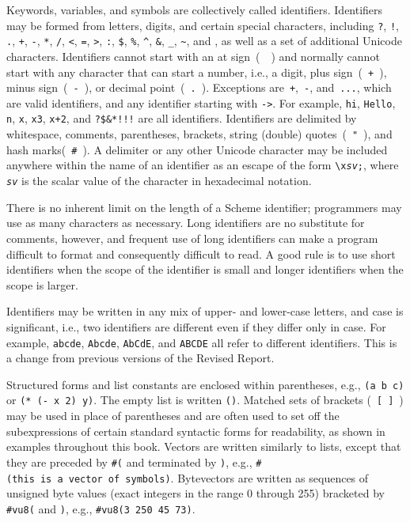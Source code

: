 Keywords, variables, and symbols are collectively called
\label{intro_s30}identifiers.
Identifiers may be formed from letters, digits, and certain special
characters, including \texttt{?}, \texttt{!}, \texttt{.}, \texttt{+},
\texttt{-}, \texttt{*}, \texttt{/}, \texttt{\textless{}}, \texttt{=}, \texttt{\textgreater{}},
\texttt{:}, \texttt{\${}}, \texttt{\%{}}, \texttt{\^{}}, \texttt{\&{}}, \texttt{\_{}},
\texttt{\~{}}, and \texttt{\@{}}, as well as a set of additional Unicode
characters.
Identifiers cannot start with an at sign ( \texttt{\@{}} ) and
normally cannot start with any character that can start
a number, i.e., a digit, plus sign ( \texttt{+} ), minus sign ( \texttt{-} ), or
decimal point ( \texttt{.} ).
Exceptions are \texttt{+}, \texttt{-}, and \texttt{...}, which are valid identifiers,
and any identifier starting with \texttt{-\textgreater{}}.
For example, \texttt{hi}, \texttt{Hello}, \texttt{n}, \texttt{x}, \texttt{x3}, \texttt{x+2}, and \texttt{?\${}\&{}*!!!} are all
identifiers.
Identifiers are delimited by whitespace, comments, parentheses, brackets, string
(double) quotes ( \texttt{"} ), and hash marks( \texttt{\#{}} ).
A delimiter or any other Unicode character may be included anywhere within the
name of an identifier as an escape of the form \texttt{\textbackslash{}x\textit{sv};},
where \texttt{\textit{sv}} is the scalar value of the character in hexadecimal
notation.


There is no inherent limit on the length of a Scheme identifier;
programmers may use as many characters as necessary.
Long identifiers are no substitute for comments, however, and
frequent use of long identifiers can make a program difficult to
format and consequently difficult to read.  
A good rule is to use short identifiers when the scope of the identifier
is small and longer identifiers when the scope is larger.


Identifiers may be written in any mix of upper- and lower-case letters,
and case is significant, i.e., two identifiers are different even if
they differ only in case.
For example, \texttt{abcde}, \texttt{Abcde}, \texttt{AbCdE}, and \texttt{ABCDE}
all refer to different identifiers.
This is a change from previous versions of the Revised Report.


Structured forms and \label{intro_s31}list constants are enclosed
within parentheses, e.g., \texttt{(a b c)} or \texttt{(* (- x 2) y)}.
The \label{intro_s32}empty list is written \label{intro_s33}\texttt{()}.
\label{intro_s34}Matched sets of brackets
( \texttt{[} \texttt{]} ) may be used in place of parentheses and are
often used to set off the subexpressions of certain standard
syntactic forms for readability, as shown in examples throughout this book.
Vectors are written similarly to lists, except that they are
preceded by \texttt{\#{}(} and terminated by \texttt{)}, e.g.,
\texttt{\#{}(this is a vector of symbols)}.
Bytevectors are written as sequences of unsigned byte values (exact
integers in the range 0 through 255) bracketed by \texttt{\#{}vu8(} and
\texttt{)}, e.g., \texttt{\#{}vu8(3 250 45 73)}.


